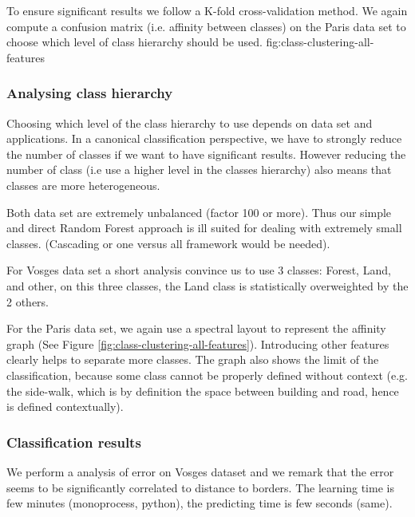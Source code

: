 		To ensure significant results we follow a K-fold cross-validation method. We again compute a confusion matrix (i.e. affinity between classes) on the Paris data set to choose which level of class hierarchy should be used.
		fig:class-clustering-all-features
		
		
		\subsubsection{Analysing class hierarchy} 
		
		Choosing which level of the class hierarchy to use depends on data set and applications.
		In a canonical classification perspective, we have to strongly reduce the number of classes if we want to have significant results.
		However reducing the number of class (i.e use a higher level in the classes hierarchy) also means that classes are more heterogeneous.
		  
		Both data set are extremely unbalanced (factor 100 or more). Thus our simple and direct Random Forest approach is ill suited for dealing with extremely small classes. (Cascading or one versus all framework would be needed).
		
		For Vosges data set a short analysis convince us to use 3 classes: Forest, Land, and other, on this three classes, the Land class is statistically overweighted by the 2 others.
		
		For the Paris data set, we again use a spectral layout to represent the affinity graph (See Figure \ref{fig:class-clustering-all-features}).
		Introducing other features clearly helps to separate more classes.
		The graph also shows the limit of the classification, because some class cannot be properly defined without context (e.g. the side-walk, which is by definition the space between building and road, hence is defined contextually). 
		
		\subsubsection{Classification results}
		We perform a analysis of error on Vosges dataset and we remark that the error seems to be significantly correlated to distance to borders.
		The learning time is few minutes (monoprocess, python), the predicting time is few seconds (same).
				 
